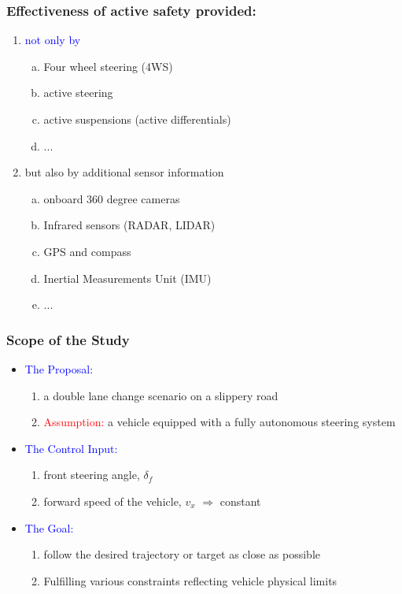 \documentclass{beamer}
\begin{document}
\begin{frame}
	
	\frametitle{Effectiveness
of active safety provided:}
	\begin{enumerate}
		\item \textcolor{blue}{not only by }
		\begin{enumerate}[a)]
			\item Four wheel steering (4WS)
			\item active steering
			\item active
suspensions (active differentials)
			\item ...
		\end{enumerate}
		\vspace{5mm}
		\item but also by additional sensor information
		\begin{enumerate}[a)]
			\item onboard 360 degree cameras
			\item Infrared sensors (RADAR, LIDAR)
			\item GPS and compass 
			\item Inertial Measurements Unit (IMU) 
			\item ...
		\end{enumerate}
	\end{enumerate}
	
\end{frame}

\begin{frame}
	
	\frametitle{Scope of the Study}
	\begin{itemize}
		\item \textcolor{blue}{The Proposal:}
		\begin{enumerate}[$\bullet$]
			\item a double lane change scenario on
a slippery road
			\item \textcolor{red}{Assumption:} a vehicle equipped with a fully autonomous steering system
		\end{enumerate}
		\vspace{5mm}
		\item \textcolor{blue}{The Control Input:}
		\begin{enumerate}[$\bullet$]
			\item front steering angle, $\delta_{f}$
			\item forward speed of the vehicle, $v_x$ $\Rightarrow$ constant			
		\end{enumerate}
		\vspace{5mm}
		\item \textcolor{blue}{The Goal:}
		\begin{enumerate}[$\bullet$]
			\item follow the desired
trajectory or target as close as possible
			\item Fulfilling various constraints reflecting
			vehicle physical limits			
		\end{enumerate}
	\end{itemize}
	
\end{frame}
\end{document}
